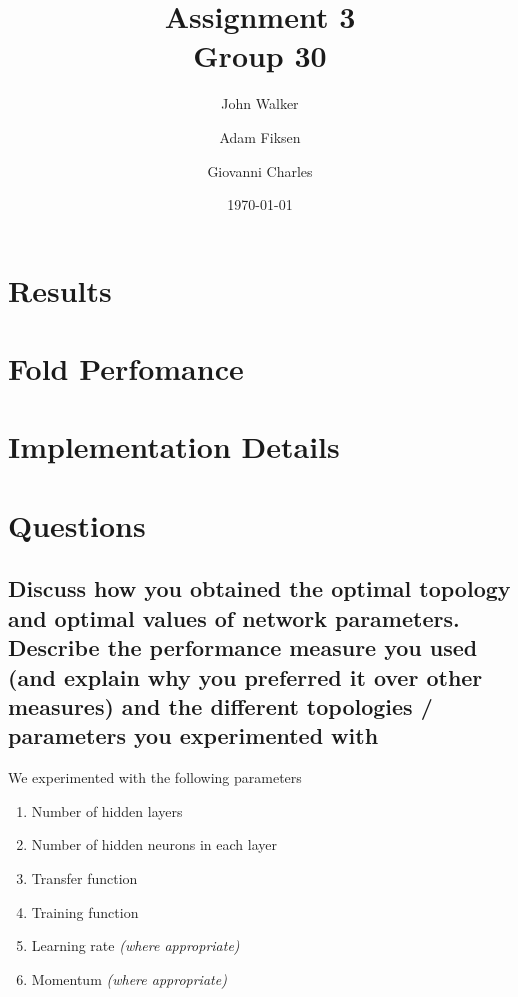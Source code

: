 \documentclass[11pt]{article}
\begin{document}
\title{Assignment 3 \\ Group 30  }

\author{John Walker \and Adam Fiksen \and Giovanni Charles }

\date{\today}         %

\maketitle           %


\section{Results}
\section{Fold Perfomance}
\section{Implementation Details}
\section{Questions}

\subsection{Discuss how you obtained the optimal topology and optimal values of network parameters. Describe the performance measure you used (and explain why you preferred it over other measures) and the different topologies / parameters you experimented with}



We experimented with the following parameters
\begin{enumerate}
  \item Number of hidden layers
  \item Number of hidden neurons in each layer
  \item Transfer function
  \item Training function
  \item Learning rate \emph{(where appropriate)}
  \item Momentum \emph{(where appropriate)}
\end{enumerate}
\end{document}
